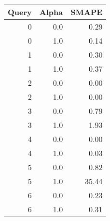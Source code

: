 \begin{tabular}{rrr}
\toprule
 Query &  Alpha &  SMAPE \\
\midrule
     0 &    0.0 &   0.29 \\
     0 &    1.0 &   0.14 \\
     1 &    0.0 &   0.30 \\
     1 &    1.0 &   0.37 \\
     2 &    0.0 &   0.00 \\
     2 &    1.0 &   0.00 \\
     3 &    0.0 &   0.79 \\
     3 &    1.0 &   1.93 \\
     4 &    0.0 &   0.00 \\
     4 &    1.0 &   0.03 \\
     5 &    0.0 &   0.82 \\
     5 &    1.0 &  35.44 \\
     6 &    0.0 &   0.23 \\
     6 &    1.0 &   0.31 \\
\bottomrule
\end{tabular}
